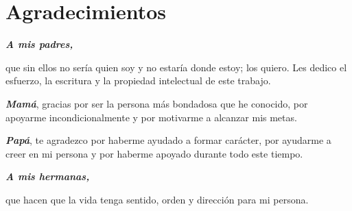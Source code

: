 


\chapter*{Agradecimientos}
\thispagestyle{agrad}

\textit{\textbf{\large{A mis padres,}}}

que sin ellos no sería quien soy y no estaría donde estoy; los quiero. Les dedico el esfuerzo, la escritura y la propiedad intelectual de este trabajo.

\textit{\textbf{Mamá}}, gracias por ser la persona más bondadosa que he conocido, por apoyarme incondicionalmente y por motivarme a alcanzar mis metas.

\textit{\textbf{Papá}}, te agradezco por haberme ayudado a formar carácter, por ayudarme a creer en mi persona y por haberme apoyado durante todo este tiempo.

\vfill


\textit{\textbf{\large{A mis hermanas,}}}

que hacen que la vida tenga sentido, orden y dirección para mi persona.



